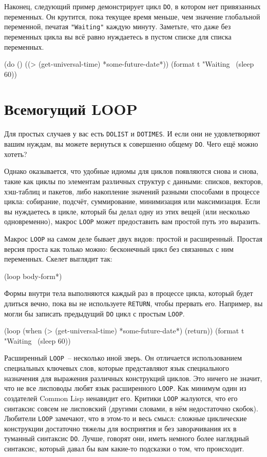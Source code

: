 Наконец, следующий пример демонстрирует цикл \lstinline{DO}, в котором нет привязанных
переменных. Он крутится, пока текущее время меньше, чем значение глобальной переменной,
печатая \lstinline{"Waiting"} каждую минуту. Заметьте, что даже без переменных цикла вы всё равно
нуждаетесь в пустом списке для списка переменных.

\begin{myverb}
(do ()
    ((> (get-universal-time) *some-future-date*))
  (format t "Waiting~%
  (sleep 60)) 
\end{myverb}

\section{Всемогущий LOOP}

Для простых случаев у вас есть \lstinline{DOLIST} и \lstinline{DOTIMES}. И если они не удовлетворяют
вашим нуждам, вы можете вернуться к совершенно общему \lstinline{DO}. Чего ещё можно хотеть?

Однако оказывается, что удобные идиомы для циклов появляются снова и снова, такие как
циклы по элементам различных структур с данными: списков, векторов, хэш-таблиц и пакетов,
либо накопление значений разными способами в процессе цикла: собирание, подсчёт,
суммирование, минимизация или максимизация. Если вы нуждаетесь в цикле, который бы делал
одну из этих вещей (или несколько одновременно), макрос \lstinline{LOOP} может предоставить вам
простой путь это выразить.

Макрос \lstinline{LOOP} на самом деле бывает двух видов: простой и расширенный. Простая версия
проста как только можно: бесконечный цикл без связанных с ним переменных. Скелет выглядит
так:

\begin{myverb}
(loop
  body-form*)
\end{myverb}

Формы внутри тела выполняются каждый раз в процессе цикла, который будет длиться вечно,
пока вы не используете \lstinline{RETURN}, чтобы прервать его. Например, вы могли бы записать
предыдущий \lstinline{DO} цикл с простым \lstinline{LOOP}.

\begin{myverb}
(loop
  (when (> (get-universal-time) *some-future-date*)
    (return))
  (format t "Waiting~%
  (sleep 60))
\end{myverb}

Расширенный \lstinline{LOOP}~-- несколько иной зверь. Он отличается использованием специальных
ключевых слов, которые представляют язык специального назначения для выражения различных
конструкций циклов. Это ничего не значит, что не все лисповоды любят язык расширенного
\lstinline{LOOP}. Как минимум один из создателей Common Lisp ненавидит его. Критики
\lstinline{LOOP} жалуются, что его синтаксис совсем не лисповский (другими словами, в нём
недостаточно скобок). Любители \lstinline{LOOP} замечают, что в этом-то и весь смысл: сложные
циклические конструкции достаточно тяжелы для восприятия и без заворачивания их в туманный
синтаксис \lstinline{DO}. Лучше, говорят они, иметь немного более наглядный синтаксис, который
давал бы вам какие-то подсказки о том, что происходит.

